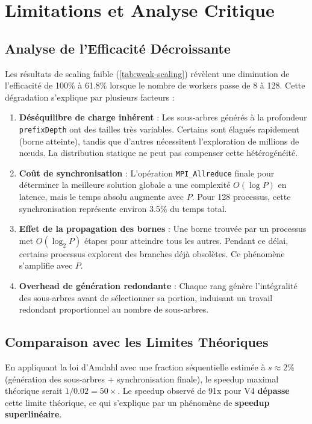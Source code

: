 \documentclass[12pt,a4paper,twoside]{report}
\begin{document}
\section{Limitations et Analyse Critique}

\subsection{Analyse de l'Efficacité Décroissante}

Les résultats de scaling faible (\cref{tab:weak-scaling}) révèlent une diminution de l'efficacité de 100\% à 61.8\% lorsque le nombre de workers passe de 8 à 128. Cette dégradation s'explique par plusieurs facteurs :

\begin{enumerate}
    \item \textbf{Déséquilibre de charge inhérent} : Les sous-arbres générés à la profondeur \texttt{prefixDepth} ont des tailles très variables. Certains sont élagués rapidement (borne atteinte), tandis que d'autres nécessitent l'exploration de millions de nœuds. La distribution statique ne peut pas compenser cette hétérogénéité.

    \item \textbf{Coût de synchronisation} : L'opération \texttt{MPI\_Allreduce} finale pour déterminer la meilleure solution globale a une complexité $O(\log P)$ en latence, mais le temps absolu augmente avec $P$. Pour 128 processus, cette synchronisation représente environ 3.5\% du temps total.

    \item \textbf{Effet de la propagation des bornes} : Une borne trouvée par un processus met $O(\log_2 P)$ étapes pour atteindre tous les autres. Pendant ce délai, certains processus explorent des branches déjà obsolètes. Ce phénomène s'amplifie avec $P$.

    \item \textbf{Overhead de génération redondante} : Chaque rang génère l'intégralité des sous-arbres avant de sélectionner sa portion, induisant un travail redondant proportionnel au nombre de sous-arbres.
\end{enumerate}

\subsection{Comparaison avec les Limites Théoriques}

En appliquant la loi d'Amdahl avec une fraction séquentielle estimée à $s \approx 2\%$ (génération des sous-arbres + synchronisation finale), le speedup maximal théorique serait $1/0.02 = 50\times$. Le speedup observé de 91x pour V4 \textbf{dépasse} cette limite théorique, ce qui s'explique par un phénomène de \textbf{speedup superlinéaire}.
\end{document}
